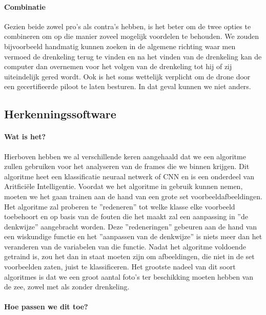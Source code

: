 \paragraph{Combinatie}

Gezien beide zowel pro's als contra's hebben, is het beter om de twee opties te combineren om op die manier zoveel mogelijk voordelen te behouden. We zouden bijvoorbeeld handmatig kunnen zoeken in de algemene richting waar men vermoed de drenkeling terug te vinden en na het vinden van de drenkeling kan de computer dan overnemen voor het volgen van de drenkeling tot hij of zij uiteindelijk gered wordt. Ook is het soms wettelijk verplicht om de drone door een gecertifieerde piloot te laten besturen. In dat geval kunnen we niet anders.

\subsection{Herkenningssoftware}

\paragraph{Wat is het?}

Hierboven hebben we al verschillende keren aangehaald dat we een algoritme zullen gebruiken voor het analyseren van de frames die we binnen krijgen. Dit algoritme heet een klassificatie neuraal netwerk of CNN en is een onderdeel van Aritficiële Intelligentie. Voordat we het algoritme in gebruik kunnen nemen, moeten we het gaan trainen aan de hand van een grote set voorbeeldafbeeldingen. Het algoritme zal proberen te ''redeneren'' tot welke klasse elke voorbeeld toebehoort en op basis van de fouten die het maakt zal een aanpassing in ''de denkwijze'' aangebracht worden. Deze ''redeneringen'' gebeuren aan de hand van een wiskundige functie en het ''aanpassen van de denkwijze'' is niets meer dan het veranderen van de variabelen van die functie. Nadat het algoritme voldoende getraind is, zou het dan in staat moeten zijn om afbeeldingen, die niet in de set voorbeelden zaten, juist te klassificeren. Het grootste nadeel van dit soort algoritmes is dat we een groot aantal foto's ter beschikking moeten hebben van de zee, zowel met als zonder drenkeling.

\paragraph{Hoe passen we dit toe?}


